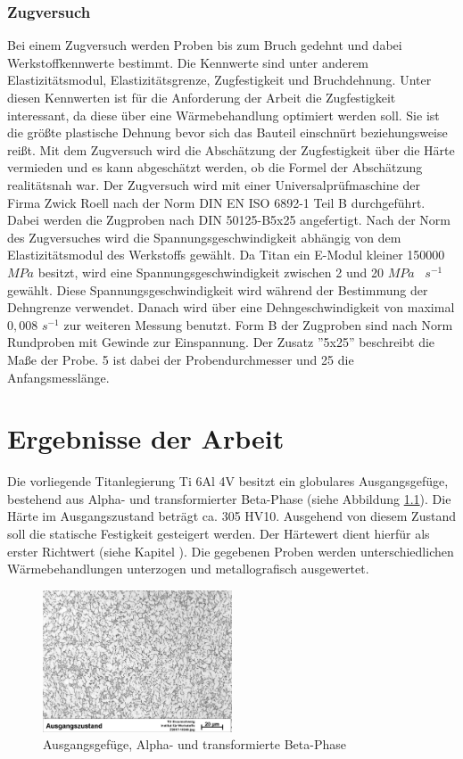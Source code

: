 \documentclass[a4paper, 11pt]{tubsreprt}
\begin{document}
\subsection{Zugversuch}
\label{Kapitel Zugversuch}
Bei einem Zugversuch werden Proben bis zum Bruch gedehnt und dabei Werkstoffkennwerte bestimmt. Die Kennwerte sind unter anderem  Elastizitätsmodul, Elastizitätsgrenze, Zugfestigkeit und Bruchdehnung. Unter diesen Kennwerten ist für die Anforderung der Arbeit die Zugfestigkeit interessant, da diese über eine Wärmebehandlung optimiert werden soll. Sie ist die größte plastische Dehnung bevor sich das Bauteil einschnürt beziehungsweise reißt. Mit dem Zugversuch wird die Abschätzung der Zugfestigkeit über die Härte vermieden und es kann abgeschätzt werden, ob die Formel der Abschätzung realitätsnah war. Der Zugversuch wird mit einer Universalprüfmaschine der Firma Zwick Roell nach der Norm DIN EN ISO 6892-1 Teil B durchgeführt. Dabei werden die Zugproben nach DIN 50125-B5x25 angefertigt. Nach der Norm des Zugversuches wird die Spannungsgeschwindigkeit abhängig von dem Elastizitätsmodul des Werkstoffs gewählt. Da Titan ein E-Modul kleiner 150000 $MPa$ besitzt, wird eine Spannungsgeschwindigkeit zwischen 2 und 20 $MPa$~ $s^{-1}$ gewählt. Diese Spannungsgeschwindigkeit wird während der Bestimmung der Dehngrenze verwendet. Danach wird über eine Dehngeschwindigkeit von maximal $0,008$ $s^{-1}$ zur weiteren Messung benutzt. Form B der Zugproben sind nach Norm Rundproben mit Gewinde zur Einspannung. Der Zusatz ''5x25'' beschreibt die Maße der Probe. 5 ist dabei der Probendurchmesser und 25 die Anfangsmesslänge. 

\chapter{Ergebnisse der Arbeit}
Die vorliegende Titanlegierung Ti 6Al 4V besitzt ein globulares Ausgangsgefüge, bestehend aus Alpha- und transformierter Beta-Phase (siehe Abbildung \ref{ausgangsgefüge Kapitel3}). Die Härte im Ausgangszustand beträgt ca. 305 HV10. Ausgehend von diesem Zustand soll die statische Festigkeit gesteigert werden. Der Härtewert dient hierfür als erster Richtwert (siehe Kapitel ). Die gegebenen Proben werden unterschiedlichen Wärmebehandlungen unterzogen und metallografisch ausgewertet. 

\begin{figure}
\centering
\includegraphics[width=0.5\textwidth]{Bilder/Ausgangsgefuege.jpg}
\caption{Ausgangsgefüge, Alpha- und transformierte Beta-Phase}
\label{ausgangsgefüge Kapitel3}
\end{figure}
\end{document}
